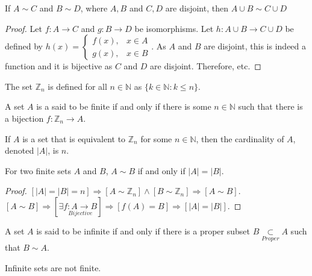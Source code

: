 \documentclass[crop=false,class=book,oneside]{standalone}
\begin{document}
            \begin{theorem}
            If $A\sim C$ and $B\sim D$, where $A,B$ and $C,D$ are disjoint, then $A\cup B \sim C\cup D$
            \end{theorem}
            \begin{proof}
            Let $f:A\rightarrow C$ and $g:B\rightarrow D$ be isomorphisms. Let $h:A\cup B \rightarrow C\cup D$ be defined by $h(x) = \begin{cases} f(x), & x\in A\\ g(x), & x\in B\end{cases}$. As $A$ and $B$ are disjoint, this is indeed a function and it is bijective as $C$ and $D$ are disjoint. Therefore, etc.
            \end{proof}
            \begin{definition}
            The set $\mathbb{Z}_n$ is defined for all $n\in \mathbb{N}$ as $\{k\in \mathbb{N}: k\leq n\}$.
            \end{definition}
            \begin{definition}
            A set $A$ is a said to be finite if and only if there is some $n\in \mathbb{N}$ such that there is a bijection $f:\mathbb{Z}_n \rightarrow A$.
            \end{definition}
            \begin{definition}
            If $A$ is a set that is equivalent to $\mathbb{Z}_n$ for some $n\in \mathbb{N}$, then the cardinality of $A$, denoted $|A|$, is $n$.
            \end{definition}
            \begin{theorem}
            For two finite sets $A$ and $B$, $A\sim B$ if and only if $|A|=|B|$.
            \end{theorem}
            \begin{proof}
            $[|A|=|B|=n]\Rightarrow[A\sim \mathbb{Z}_n]\land[B\sim \mathbb{Z}_n]\Rightarrow [A\sim B]$. $[A\sim B]\Rightarrow [\exists \underset{Bijective}{f:A\rightarrow B}]\Rightarrow [f(A) = B]\Rightarrow [|A|=|B|]$.
            \end{proof}
            \begin{definition}
            A set $A$ is said to be infinite if and only if there is a proper subset $B\underset{Proper}\subset A$ such that $B\sim A$.
            \end{definition}
            \begin{theorem}
            Infinite sets are not finite.
            \end{theorem}
\end{document}
